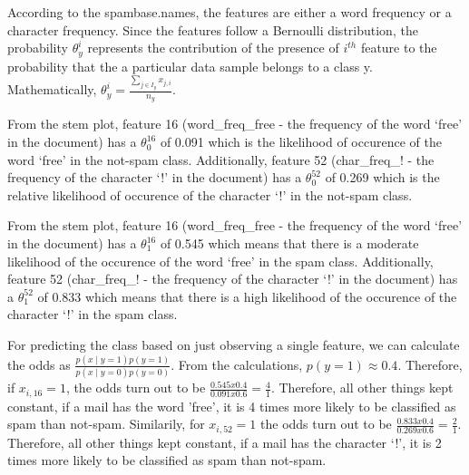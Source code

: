 \documentclass[openany,11pt]{homework}
\begin{document}
According to the spambase.names, the features are either a word frequency or a character frequency. Since the features follow a Bernoulli distribution, the probability $\theta_y^{i}$ represents the contribution of the presence of $i^{th}$ feature to  the probability that the a particular data sample belongs to a class y. Mathematically, $\theta_y^{i} = \frac{\sum_{j \in I_y} x_{j,i}}{n_y}$.

From the stem plot, feature 16 (word\_freq\_free - the frequency of the word `free' in the document) has a $\theta_0^{16}$ of 0.091 which is the likelihood of occurence of the word `free' in the not-spam class. Additionally, feature 52 (char\_freq\_! - the frequency of the character `!' in the document) has a $\theta_0^{52}$ of 0.269 which is the relative likelihood of occurence of the character `!' in the not-spam class.

From the stem plot, feature 16 (word\_freq\_free - the frequency of the word `free' in the document) has a $\theta_1^{16}$ of 0.545 which means that there is a moderate likelihood of the occurence of the word `free' in the spam class. Additionally, feature 52 (char\_freq\_! - the frequency of the character `!' in the document) has a $\theta_1^{52}$ of 0.833 which means that there is a high likelihood of the occurence of the character `!' in the spam class.

For predicting the class based on just observing a single feature, we can calculate the odds as $\frac{p(x \mid y = 1)p(y = 1)}{p(x \mid y = 0)p(y = 0)}$. From the calculations, $p(y = 1) \approx 0.4$. Therefore, if $x_{i,16} = 1$, the odds turn out to be $\frac{0.545 x 0.4}{0.091 x 0.6} = \frac{4}{1}$. Therefore, all other things kept constant, if a mail has the word 'free', it is 4 times more likely to be classified as spam than not-spam. Similarily, for $x_{i,52} = 1$ the odds turn out to be $\frac{0.833 x 0.4}{0.269 x 0.6} = \frac{2}{1}$. Therefore, all other things kept constant, if a mail has the character `!', it is 2 times more likely to be classified as spam than not-spam.
\end{document}
